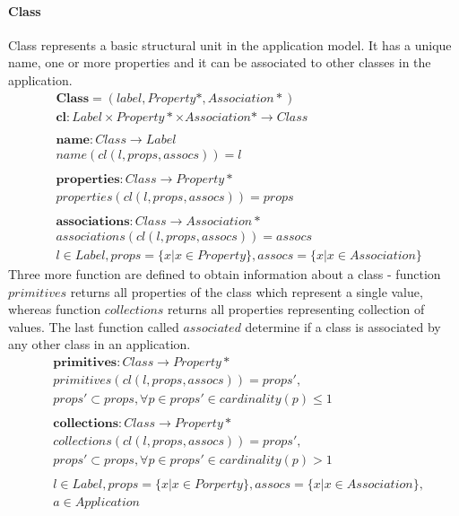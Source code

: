\documentclass[11pt]{article}
\begin{document}
\paragraph{Class} Class represents a basic structural unit in the application model. It has a unique name, one or more properties and it can be associated to other classes in the application. 
\begin{align*}
& 	\mathbf{Class} = (label, Property*, Association*) \\
& 	\mathbf{cl} : Label \times Property* \times Association* \rightarrow Class \\\\
& 	\mathbf{name} : Class \rightarrow Label \\
& 	name(cl(l, props, assocs)) = l \\ \\
& 	\mathbf{properties} : Class \rightarrow Property* \\
& 	properties(cl(l, props, assocs)) = props \\ \\
& 	\mathbf{associations} : Class \rightarrow Association* \\ 
& 	associations(cl(l, props, assocs)) = assocs \\ 
& 	l \in Label, props = \{ x | x \in Property\}, assocs = \{ x | x \in Association \}
\end{align*}
Three more function are defined to obtain information about a class - function $primitives$ returns all properties of the class which represent a single value, whereas function $collections$ returns all properties representing collection of values. The last function called $associated$ determine if a class is associated by any other class in an application.
\begin{align*}
&	\mathbf{primitives} : Class \rightarrow Property* \\
&	primitives(cl(l, props, assocs)) = props', \\ 
& props' \subset props,  \forall p \in props' \in cardinality(p) \leq 1 \\ \\
&	\mathbf{collections} : Class \rightarrow Property* \\	
& collections(cl(l, props, assocs)) = props',  \\
& props' \subset props, \forall p \in props' \in cardinality(p) > 1 \\ \\
&	l \in Label, props = \{ x | x \in Porperty\}, assocs  = \{ x | x \in Association\}, \\
& a \in Application
\end{align*}
	 
\end{document}
